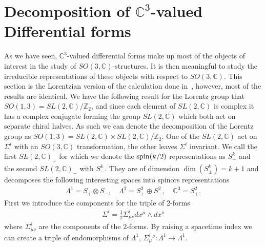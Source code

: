 \documentclass[10pt]{report}
\theoremstyle{definition}
\newcommand{\C}[0]{\mathbb{C}}
\newcommand{\Z}{{\mathbb{Z}}}
\newcommand{\E}[0]{\C^3}
\begin{document}
\section{Decomposition of \texorpdfstring{$\E$}{C3}-valued Differential forms}\label{subsec:pleb-C3-valued-forms-decomp}
As we have seen, $\E$-valued differential forms make up most of the objects of interest in the study of $SO(3,\C)$-structures. It is then meaningful to study the irreducible representations of these objects with respect to $SO(3,\C)$. This section is the Lorentzian version of the calculation done in~\cite{Su2StructureBhoja2024}, however, most of the results are identical. We have the following result for the Lorentz group that $SO(1,3) = SL(2,\C)/\Z_2 $, and since each element of $SL(2,\C)$ is complex it has a complex conjugate forming the group $\overline{SL(2,\C)}$ which both act on separate chiral halves. As such we can denote the decomposition of the Lorentz group as $SO(1,3) = SL(2,\C) \times \overline{SL(2,\C)}/\Z_2$. One of the $SL(2,\C)$ act on $\Sigma^i$ with an $SO(3,\C)$ transformation, the other leaves $\Sigma^i$ invariant. We call the first $SL{(2,\C)}_+$ for which we denote the ${\rm spin}(k/2)$ representations as $S_+^k$ and the second $SL{(2,\C)}_-$ with $S_-^k$. They are of dimension $\dim(S_\pm^k) = k+1$ and decomposes the following interesting spaces into spinors representations
\begin{align}
    \Lambda^1 = S_+ \otimes S_-, \quad \Lambda^2 = S_+^2 \oplus S_-^2, \quad \E = S_+^2.
\end{align}
First we introduce the components for the triple of 2-forms 
\begin{align}
    \Sigma^i = \frac{1}{2} \Sigma^i_{\mu\nu} dx^\mu \wedge dx^\nu
\end{align}
where $\Sigma^i_{\mu\nu}$ are the components of the 2-forms. By raising a spacetime index we can create a triple of endomorphisms of $\Lambda^1$, $\Sigma^i_\mu{}^\nu : \Lambda^1 \rightarrow \Lambda^1$. 
\end{document}
